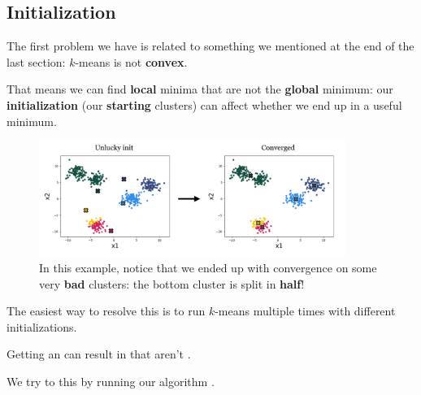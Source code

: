     \subsection*{Initialization}
    
        The first problem we have is related to something we mentioned at the end of the last section: $k$-means is not \textbf{convex}. 
        
        That means we can find \textbf{local} minima that are not the \textbf{global} minimum: our \textbf{initialization} (our \textbf{starting} clusters) can affect whether we end up in a useful minimum.
            
        \begin{figure}[H]
            \centering
            \includegraphics[width=100mm,scale=0.4]{images/clustering_images/unlucky_init.png}
            \caption*{In this example, notice that we ended up with convergence on some very \textbf{bad} clusters: the bottom cluster is split in \textbf{half}!}
        \end{figure}
        
        The easiest way to resolve this is to run $k$-means multiple times with different initializations.
            \\
        
        \begin{concept}
            Getting an  can result in  that aren't .
            
            We try to  this by running our algorithm .
        \end{concept}